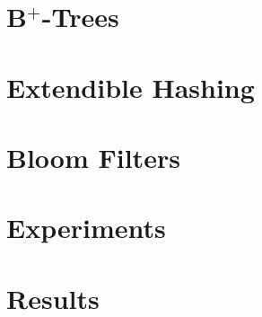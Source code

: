 \section{B$^+$-Trees} %
\label{sec:b_trees}


\section{Extendible Hashing} %
\label{sec:extendible_hashing}


\section{Bloom Filters} %
\label{sec:bloom_filters}


\section{Experiments} %
\label{sec:experiments_indexing}


\section{Results} %
\label{sec:results_indexing}

